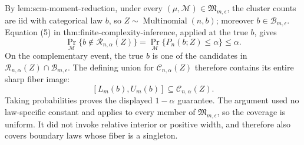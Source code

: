 By lem:scm-moment-reduction, under every \((\mu,\mathcal M)\in\mathfrak M_{m,\epsilon}\), the cluster counts are iid with categorical law \(b\), so \(Z\sim\operatorname{Multinomial}(n,b)\); moreover \(b\in\mathcal B_{m,\epsilon}\).  Equation (5) in thm:finite-complexity-inference, applied at the true \(b\), gives
\[
 \Pr_{\mathcal M}\{b\notin\mathcal R_{n,\alpha}(Z)\}
 =\Pr_{\mathcal M}\{P_n(b;Z)\leq\alpha\}\leq\alpha.
\]
On the complementary event, the true \(b\) is one of the candidates in \(\mathcal R_{n,\alpha}(Z)\cap\mathcal B_{m,\epsilon}\).  The defining union for \(\mathcal C_{n,\alpha}(Z)\) therefore contains its entire sharp fiber image:
\[
 [L_m(b),U_m(b)]\subseteq\mathcal C_{n,\alpha}(Z).
\]
Taking probabilities proves the displayed \(1-\alpha\) guarantee.  The argument used no law-specific constant and applies to every member of \(\mathfrak M_{m,\epsilon}\), so the coverage is uniform.  It did not invoke relative interior or positive width, and therefore also covers boundary laws whose fiber is a singleton.